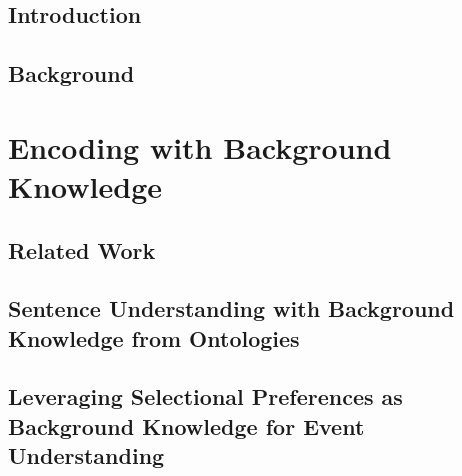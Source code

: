 \documentclass[hidelinks,12pt]{cmuthesis}
\begin{document}
\begin{abstract}
\end{abstract}

% 



\tableofcontents
\listoffigures
\listoftables

\mainmatter


%
%
%
%
%


\chapter{Introduction}
\label{chapter:introduction}

\chapter{Background}
\label{chapter:background}

\part{Encoding with Background Knowledge}
\chapter{Related Work}
\label{chapter:encoding_related_work}

\chapter{Sentence Understanding with Background Knowledge from Ontologies}
\label{chapter:ontolstm}

\chapter{Leveraging Selectional Preferences as Background Knowledge for Event Understanding}
\label{chapter:nem}

\end{document}
